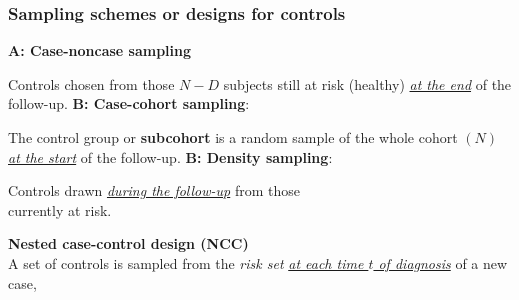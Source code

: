 \documentclass[handout,12pt]{beamer}
\begin{document}

\begin{frame}
\frametitle{Sampling schemes or designs for controls}

\medskip
\pause
{\bf A:  Case-noncase sampling}\\
\pause
           \bi
           \item
           Controls chosen from those $N-D$ 
           subjects %
                            still at risk (healthy) 
                    \underline{\it at the end}
				    of the follow-up. 
	     \ei \pause
\pause   	     
{\bf B:  Case-cohort sampling}: %
\pause\medskip
	     \bi
\item The control group or {\bf subcohort}   
           is a random sample of the whole cohort $(N)$  
				    \underline{\it at the start} of the follow-up.
           \ei
\pause           	     
{\bf B:  Density sampling}: \\ %
         \pause\medskip  \bi 
           \item  
           Controls drawn 
            \underline{\it during the follow-up}
              from those \\ currently at risk. 
           \medskip
           \item {\bf Nested case-control design (NCC)}
             \\
         A set of controls is sampled from
         the {\it risk set} 
			  \underline{\it at each time $t$ of diagnosis}
                           of a new case,
	     \ei
\end{frame}
\end{document}
